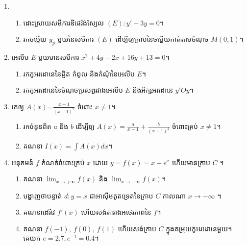 \documentclass{officialexam}
\begin{document}
  \begin{center}
  \end{center}
  \begin{enumerate}[I]
  	\item \begin{enumerate}[k]
  		\item ដោះស្រាយសមីការឌីផេរ៉ង់ស្យែល $(E): y'-3y=0$។
  		\item រកចម្លើយ $y_p$ មួយនៃសមីការ $(E)$ ដើម្បីឲ្យក្រាបនៃចម្លើយកាត់តាមចំណុច $M\left(0,1\right)$។
  	\end{enumerate}
  	\item អេលីប $E$ មួយមានសមីការ $x^2+4y-2x+16y+13=0$។
  	\begin{enumerate}[k]
  		\item រកកូអរដោនេនៃផ្ចិត កំពូល និងកំណុំនៃអេលីប $E$។
  		\item រកកូអរដោនេនៃចំណុចប្រសព្វរវាងអេលីប $E$ និងអ័ក្សអរដោនេ $y'Oy$។
  	\end{enumerate}
  	\item គេឲ្យ $A(x)$=$\frac{x+1}{\left(x-1\right)^2}$ ចំពោះ $x\ne 1$។
  	\begin{enumerate}[k]
  		\item រកចំនួនពិត $a$ និង $b$ ដើម្បីឲ្យ $A(x)=\frac{a}{x-1}+\frac{b}{\left(x-1\right)^2}$ ចំពោះគ្រប់ $x\ne1$។
  		\item គណនា $I(x)=\int A(x)dx$។
  	\end{enumerate}
  	\item អនុគមន៍ $f$ កំណត់ចំពោះគ្រប់ $x$ ដោយ $y=f(x)=x+e^x$ ហើយមានក្រាប $C$ ។
  	\begin{enumerate}[k]
  		\item គណនា $\lim_{x \to +\infty } f(x)$ និង $\lim_{x \to -\infty } f(x)$។
  		\item បង្ហាញថាបន្ទាត់ $d:y=x$ ជាអាសុីមតូតទ្រេតនៃក្រាប $C$ កាលណា $x\to -\infty$ ។
  		\item គណនាដេរីវេ $f'(x)$ ហើយសង់តារាងអថេរភាពនៃ $f$។
  		\item គណនា $f(-1),~f(0),~f(1)$ ហើយសង់ក្រាប $C$ ក្នុងតម្រុយកូអរដោនេមួយ។ គេយក $e=2.7, e^{-1}=0.4$។
  	\end{enumerate}
  \end{enumerate}
  \newpage
  \maketitle
  \begin{center}
  \end{center}
\end{document}
